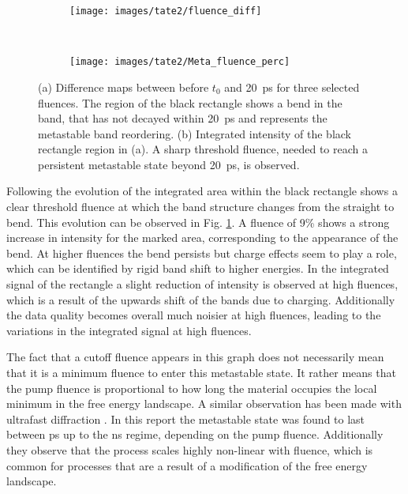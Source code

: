 \begin{figure}
	\centering
	\begin{subfigure}[b]{0.66\textwidth}
		\texttt{[image: images/tate2/fluence\_diff]}
		\caption{}
	\end{subfigure}
	\\
	\begin{subfigure}[b]{0.33\textwidth}
		\texttt{[image: images/tate2/Meta\_fluence\_perc]}
		\caption{}
	\end{subfigure}
	\caption{(a) Difference maps between before $t_0$ and \qty{20}{\pico\second} for three selected fluences. The region of the black rectangle shows a bend in the band, that has not decayed within \qty{20}{\pico\second} and represents the metastable band reordering. (b) Integrated intensity of the black rectangle region in (a). A sharp threshold fluence, needed to reach a persistent metastable state beyond \qty{20}{\pico\second}, is observed.}
	\label{fig:tate_fluence}
\end{figure}

Following the evolution of the integrated area within the black rectangle shows a clear threshold fluence at which the band structure changes from the straight to bend.
This evolution can be observed in Fig. \ref{fig:tate_fluence}.
A fluence of 9\% shows a strong increase in intensity for the marked area, corresponding to the appearance of the bend.
At higher fluences the bend persists but charge effects seem to play a role, which can be identified by rigid band shift to higher energies.
In the integrated signal of the rectangle a slight reduction of intensity is observed at high fluences, which is a result of the upwards shift of the bands due to charging.
Additionally the data quality becomes overall much noisier at high fluences, leading to the variations in the integrated signal at high fluences.

The fact that a cutoff fluence appears in this graph does not necessarily mean that it is a minimum fluence to enter this metastable state.
It rather means that the pump fluence is proportional to how long the material occupies the local minimum in the free energy landscape.
A similar observation has been made with ultrafast diffraction \cite{domrose_femtosecond_2024}.
In this report the metastable state was found to last between \unit{\pico\second} up to the \unit{\nano\second} regime, depending on the pump fluence.
Additionally they observe that the process scales highly non-linear with fluence, which is common for processes that are a result of a modification of the free energy landscape.

